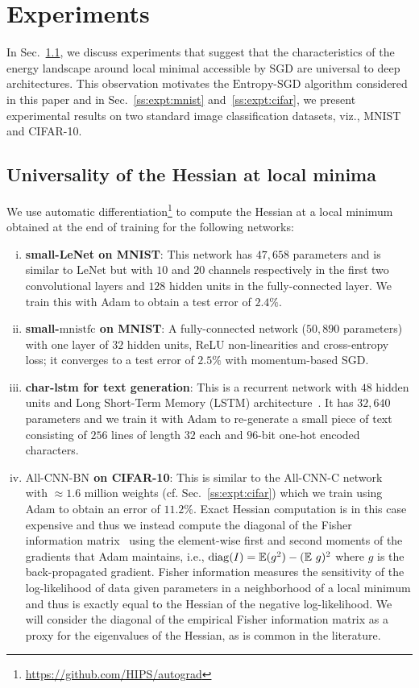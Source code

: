 \documentclass[10pt]{article}
\newcommand{\entropysgd}{\mathrm{Entropy}\textrm{-}\mathrm{SGD}}
\newcommand{\mnistfc}{\textrm{mnistfc}}
\newcommand{\lenet}{\textrm{LeNet}}
\newcommand{\allcnn}{\textrm{All-CNN-BN}}
\begin{document}
\section{Experiments}
\label{s:expt}

In Sec.~\ref{ss:expt:universality}, we discuss experiments that suggest that the characteristics of the energy landscape around local minimal accessible by SGD are universal to deep architectures.  This observation motivates the $\entropysgd$ algorithm considered in this paper and in Sec.~\ref{ss:expt:mnist} and~\ref{ss:expt:cifar}, we present experimental results on two standard image classification datasets, viz., MNIST and CIFAR-10.

\subsection{Universality of the Hessian at local minima}
\label{ss:expt:universality}

We use automatic differentiation\footnote{\href{https://github.com/HIPS/autograd}{https://github.com/HIPS/autograd}} to compute the Hessian at a local minimum obtained at the end of training for the following networks:

\begin{enumerate}[(i)]
\item \textbf{small-LeNet on MNIST}: This network has $47,658$ parameters and is similar to $\lenet$ but with $10$ and $20$ channels respectively in the first two convolutional layers and $128$ hidden units in the fully-connected layer. We train this with Adam to obtain a test error of $2.4\%$.
%
\item \textbf{small-$\mnistfc$ on MNIST}: A fully-connected network ($50,890$ parameters) with one layer of $32$ hidden units, ReLU non-linearities and cross-entropy loss; it converges to a test error of $2.5\%$ with momentum-based SGD.
%
\item \textbf{char-lstm for text generation}: This is a recurrent network with $48$ hidden units and Long Short-Term Memory (LSTM) architecture~\citep{hochreiter1997long}. It has $32,640$ parameters and we train it with Adam to re-generate a small piece of text consisting of $256$ lines of length $32$ each and $96$-bit one-hot encoded characters.
%
\item \textbf{$\allcnn$ on CIFAR-10}: This is similar to the All-CNN-C network~\citep{springenberg2014striving} with $\approx 1.6$ million weights (cf. Sec.~\ref{ss:expt:cifar}) which we train using Adam to obtain an error of $11.2\%$. Exact Hessian computation is in this case expensive and thus we instead compute the diagonal of the Fisher information matrix~\citep{wasserman2013all} using the element-wise first and second moments of the gradients that Adam maintains, i.e., $\mathrm{diag} (I) = \mathbb{E}(g^2) - (\mathbb{E}\ g)^2$ where $g$ is the back-propagated gradient. Fisher information measures the sensitivity of the log-likelihood of data given parameters in a neighborhood of a local minimum and thus is exactly equal to the Hessian of the negative log-likelihood. We will consider the diagonal of the empirical Fisher information matrix as a proxy for the eigenvalues of the Hessian, as is common in the literature.
\end{enumerate}
\end{document}
